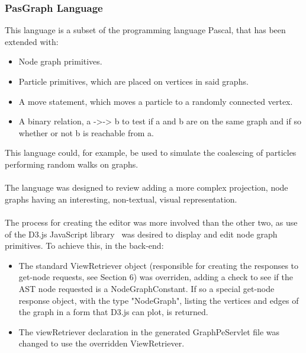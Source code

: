 \documentclass{article}
\begin{document}
{%



\subsubsection{PasGraph Language}\label{pasgraph}
This language is a subset of the programming language Pascal, that has been extended with: 
\begin{itemize}
\item Node graph primitives.
\item Particle primitives, which are placed on vertices in said graphs.
\item A move statement, which moves a particle to a randomly connected vertex.
\item A binary relation, a ->-> b to test if a and b are on the same graph and if so whether or not b is reachable from a.
\end{itemize}
This language could, for example, be used to simulate the coalescing of particles performing random walks on graphs. 
\\
\\
The language was designed to review adding a more complex projection, node graphs having an interesting, non-textual, visual representation.
\\
\\
The process for creating the editor was more involved than the other two, as use of the D3.js JavaScript library~\cite{d3} was desired to display and edit node graph primitives. To achieve this, in the back-end:
\begin{itemize}
\item The standard ViewRetriever object (responsible for creating the responses to get-node requests, see Section 6) was overriden, adding a check to see if the AST node requested is a NodeGraphConstant. If so a special get-node response object, with the type "NodeGraph", listing the vertices and edges of the graph in a form that D3.js can plot, is returned. 
\item The viewRetriever declaration in the generated GraphPeServlet file was changed to use the overridden ViewRetriever.

\end{itemize}}
\end{document}
